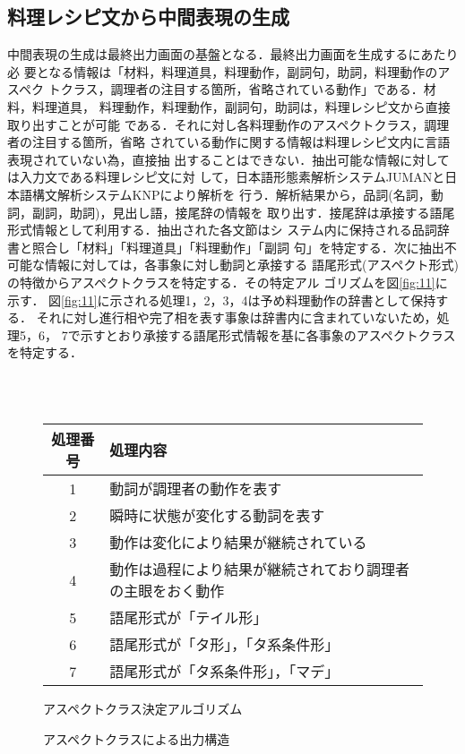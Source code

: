 \vspace*{-10mm}
\subsection{料理レシピ文から中間表現の生成}

中間表現の生成は最終出力画面の基盤となる．最終出力画面を生成するにあたり必
要となる情報は「材料，料理道具，料理動作，副詞句，助詞，料理動作のアスペク
トクラス，調理者の注目する箇所，省略されている動作」である．材料，料理道具，
料理動作，料理動作，副詞句，助詞は，料理レシピ文から直接取り出すことが可能
である．それに対し各料理動作のアスペクトクラス，調理者の注目する箇所，省略
されている動作に関する情報は料理レシピ文内に言語表現されていない為，直接抽
出することはできない．抽出可能な情報に対しては入力文である料理レシピ文に対
して，日本語形態素解析システムJUMANと日本語構文解析システムKNPにより解析を
行う．解析結果から，品詞(名詞，動詞，副詞，助詞)，見出し語，接尾辞の情報を
取り出す．接尾辞は承接する語尾形式情報として利用する．抽出された各文節はシ
ステム内に保持される品詞辞書と照合し「材料」「料理道具」「料理動作」「副詞
句」を特定する．次に抽出不可能な情報に対しては，各事象に対し動詞と承接する
語尾形式(アスペクト形式)の特徴からアスペクトクラスを特定する．その特定アル
ゴリズムを図\ref{fig:11}に示す．
図\ref{fig:11}に示される処理1，2，3，4は予め料理動作の辞書として保持する．
それに対し進行相や完了相を表す事象は辞書内に含まれていないため，処理5，6，
7で示すとおり承接する語尾形式情報を基に各事象のアスペクトクラスを特定する．

\begin{figure}[ht]
\begin{center}
\vspace*{-5mm}
~\\
~\\
{\small 
 \begin{tabular}{|c|l|} \hline  
処理番号 & 処理内容                              \\ \hline\hline
1        & 動詞が調理者の動作を表す              \\ \hline
2        & 瞬時に状態が変化する動詞を表す        \\ \hline
3        & 動作は変化により結果が継続されている  \\ \hline
4        & 動作は過程により結果が継続されており調理者の主眼をおく動作\\ \hline
5        & 語尾形式が「テイル形」                \\ \hline
6        & 語尾形式が「タ形」，「タ系条件形」    \\ \hline
7        & 語尾形式が「タ系条件形」，「マデ」    \\ \hline  
 \end{tabular}}
\caption{アスペクトクラス決定アルゴリズム}\label{fig:11}
\end{center}
\vspace{2mm}
\begin{center}
\caption{アスペクトクラスによる出力構造}\label{fig:13}
\end{center}
\end{figure}


